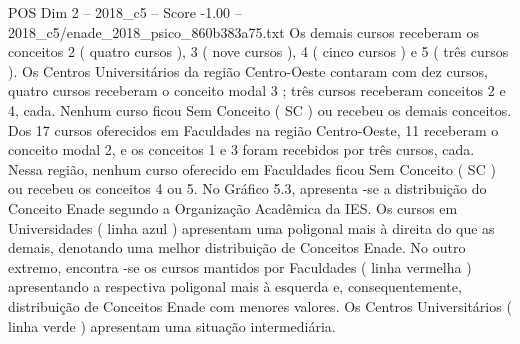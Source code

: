 \begin{textsample}{POS Dim 2 – 2018\_c5 – Score -1.00 – 2018\_c5/enade\_2018\_psico\_860b383a75.txt}
Os demais cursos receberam os conceitos 2 ( quatro cursos ), 3 ( nove cursos ), 4 ( cinco cursos ) e 5 ( três cursos ).
Os Centros Universitários da região Centro-Oeste contaram com dez cursos, quatro cursos receberam o conceito modal 3 ; três cursos receberam conceitos 2 e 4, cada.
Nenhum curso ficou Sem Conceito ( SC ) ou recebeu os demais conceitos.
Dos 17 cursos oferecidos em Faculdades na região Centro-Oeste, 11 receberam o conceito modal 2, e os conceitos 1 e 3 foram recebidos por três cursos, cada.
Nessa região, nenhum curso oferecido em Faculdades ficou Sem Conceito ( SC ) ou recebeu os conceitos 4 ou 5.
No Gráfico 5.3, apresenta -se a distribuição do Conceito Enade segundo a Organização Acadêmica da IES.
Os cursos em Universidades ( linha azul ) apresentam uma poligonal mais à direita do que as demais, denotando uma melhor distribuição de Conceitos Enade.
No outro extremo, encontra -se os cursos mantidos por Faculdades ( linha vermelha ) apresentando a respectiva poligonal mais à esquerda e, consequentemente, distribuição de Conceitos Enade com menores valores.
Os Centros Universitários ( linha verde ) apresentam uma situação intermediária.

\end{textsample}
